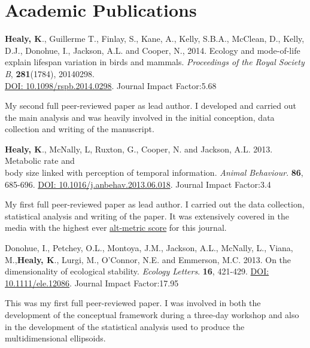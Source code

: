 \documentclass[10pt,a4paper]{article}
\begin{document}
\section{Academic Publications}
\begin{flushleft}
\textbf{Healy, K}., Guillerme T., Finlay, S., Kane, A., Kelly, S.B.A., McClean, D., Kelly, D.J., Donohue, I., Jackson, A.L. and Cooper, N., 2014. Ecology and mode-of-life explain lifespan variation in birds and mammals. \textit{Proceedings of the Royal Society B}, \textbf{281}(1784), 20140298.\\ \href{http://rspb.royalsocietypublishing.org/content/281/1784/20140298.full.pdf?keytype=ref&ijkey=gPt28ElSAYBvRhZ}{DOI: 10.1098/rspb.2014.0298}. Journal Impact Factor:5.68
\smallskip
\par{\fontsize{10.5}{10}\selectfont My second full peer-reviewed paper as lead author. I developed and carried out the main analysis and was heavily involved in the initial conception, data collection and writing of the manuscript.}

\bigskip

\textbf{Healy, K}., McNally, L, Ruxton, G., Cooper, N. and Jackson, A.L. 2013. Metabolic rate and\\
body size linked with perception of temporal information.  \textit{Animal Behaviour}. \textbf{86}, 685-696. \href{http://dx.doi.org/10.1016/j.anbehav.2013.06.018}{DOI: 10.1016/j.anbehav.2013.06.018}. Journal Impact Factor:3.4
\smallskip
\par{\fontsize{10.5}{10}\selectfont My first full peer-reviewed paper as lead author. I carried out the data collection, statistical analysis and writing of the paper. It was extensively covered in the media with the highest ever \href{http://www.altmetric.com/details.php?key=517059da36b98ab7d4941284da32e5f7&citation_id=1705703&embedded=true}{alt-metric score} for this journal.} %

\bigskip

\setlength{\parindent}{0mm}Donohue, I., Petchey, O.L., Montoya, J.M., Jackson, A.L., McNally, L., Viana, M.,\textbf{Healy, K}., Lurgi, M., O’Connor, N.E. and Emmerson, M.C. 2013. On the dimensionality of ecological stability. \textit{Ecology Letters}. \textbf{16}, 421-429. \href{http://onlinelibrary.wiley.com/doi/10.1111/ele.12086/abstract}{DOI: 10.1111/ele.12086}.  Journal Impact Factor:17.95\\
\smallskip
\par{\fontsize{10.5}{10}\selectfont This was my first full peer-reviewed paper. I was involved in both the development of the conceptual framework during a three-day workshop and also in the development of the statistical analysis used to produce the multidimensional ellipsoids.}
\end{flushleft}
\end{document}
